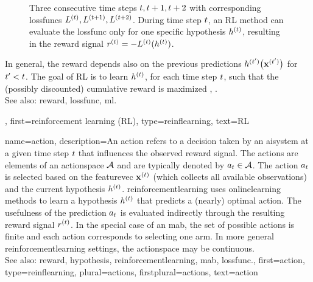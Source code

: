 {{\begin{figure}[H]
\begin{center}
		\caption{Three consecutive time steps $t,t+1,t+2$ with corresponding \glspl{lossfunc} $L^{(t)},
			L^{(t+1)}, L^{(t+2)}$. During time step $t$, an RL method can evaluate the 
			\gls{lossfunc} only for one specific \gls{hypothesis} $h^{(t)}$, resulting in the \gls{reward} 
			signal $r^{(t)}=-L^{(t)}(h^{(t)})$. \label{fig_reinforcementlearning_dict}}
		\end{center}
		\end{figure}
		In general, the \gls{reward} depends also on the 
		previous \glspl{prediction} $h^{(t')}\big({\bf x}^{(t')}\big)$ 
		for $t' < t$. The goal of RL is to learn $h^{(t)}$, for 
		each time step $t$, such that the (possibly discounted) cumulative \gls{reward} 
		is maximized \cite{MLBasics}, \cite{SuttonEd2}.
		\\
		See also: \gls{reward}, \gls{lossfunc}, \gls{ml}.},
	first={reinforcement learning (RL)},
	type=reinflearning,
	text={RL}
}

{name={action},
	description={An action refers to a decision taken by an \gls{aisystem}
		at a given time step $t$ that influences the observed 
		\gls{reward} signal. The actions are elements of an 
		\gls{actionspace} $\mathcal{A}$ and are typically denoted by 
		$a_{t} \in \mathcal{A}$. The action $a_{t}$ is selected 
		based on the \gls{featurevec} ${\bf x}^{(t)}$ (which collects 
		all available observations) and the current 
		\gls{hypothesis} $h^{(t)}$. 
		\Gls{reinforcementlearning} uses \gls{onlinelearning} methods 
		to learn a \gls{hypothesis} $h^{(t)}$ that predicts 
		a (nearly) optimal action. The usefulness of the 
		\gls{prediction} $a_{t}$ is evaluated indirectly 
		through the resulting \gls{reward} signal $r^{(t)}$.
		In the special case of an \gls{mab}, the set of possible actions is 
		finite and each action corresponds to selecting one arm. In more
		general \gls{reinforcementlearning} settings, the \gls{actionspace} may be \gls{continuous}.
		\\
		See also: \gls{reward}, \gls{hypothesis}, \gls{reinforcementlearning}, \gls{mab}, \gls{lossfunc}.},
	first={action},
	type=reinflearning,
	plural={actions},
	firstplural={actions},
	text={action}
}

